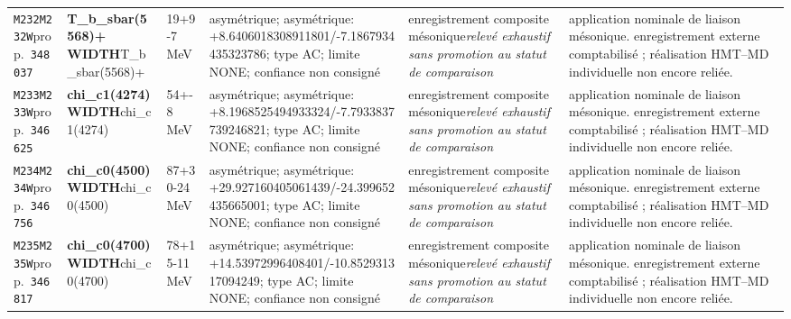 \begin{landscape}
\begin{longtable}{L{1.85cm}L{4.45cm}L{2.35cm}L{4.05cm}L{3.35cm}L{7.15cm}}
\texttt{M232}\newline \texttt{M232W}\newline prop.\ \texttt{348037} & \textbf{T\_\allowbreak{}b\_\allowbreak{}sbar(5568)+ WIDTH}\newline T\_\allowbreak{}b\_\allowbreak{}sbar(5568)+ & 19+9-7\,MeV & asymétrique; asymétrique: +8.6406018308911801/-7.1867934435323786; type AC; limite NONE; confiance non consigné & enregistrement composite mésonique\newline \emph{relevé exhaustif sans promotion au statut de comparaison} & application nominale de liaison mésonique. enregistrement externe comptabilisé ; réalisation HMT--MD individuelle non encore reliée. \\
\texttt{M233}\newline \texttt{M233W}\newline prop.\ \texttt{346625} & \textbf{chi\_\allowbreak{}c1(4274) WIDTH}\newline chi\_\allowbreak{}c1(4274) & 54+-8\,MeV & asymétrique; asymétrique: +8.1968525494933324/-7.7933837739246821; type AC; limite NONE; confiance non consigné & enregistrement composite mésonique\newline \emph{relevé exhaustif sans promotion au statut de comparaison} & application nominale de liaison mésonique. enregistrement externe comptabilisé ; réalisation HMT--MD individuelle non encore reliée. \\
\texttt{M234}\newline \texttt{M234W}\newline prop.\ \texttt{346756} & \textbf{chi\_\allowbreak{}c0(4500) WIDTH}\newline chi\_\allowbreak{}c0(4500) & 87+30-24\,MeV & asymétrique; asymétrique: +29.927160405061439/-24.399652435665001; type AC; limite NONE; confiance non consigné & enregistrement composite mésonique\newline \emph{relevé exhaustif sans promotion au statut de comparaison} & application nominale de liaison mésonique. enregistrement externe comptabilisé ; réalisation HMT--MD individuelle non encore reliée. \\
\texttt{M235}\newline \texttt{M235W}\newline prop.\ \texttt{346817} & \textbf{chi\_\allowbreak{}c0(4700) WIDTH}\newline chi\_\allowbreak{}c0(4700) & 78+15-11\,MeV & asymétrique; asymétrique: +14.53972996408401/-10.852931317094249; type AC; limite NONE; confiance non consigné & enregistrement composite mésonique\newline \emph{relevé exhaustif sans promotion au statut de comparaison} & application nominale de liaison mésonique. enregistrement externe comptabilisé ; réalisation HMT--MD individuelle non encore reliée. \\

\end{longtable}
\end{landscape}
